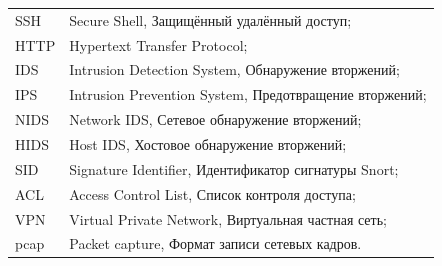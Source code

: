 
\noindent
\begin{tabular}{@{}p{2.8cm}@{\ \mdash\ }p{11.8cm}@{}}
SSH & Secure Shell, Защищённый удалённый доступ;\\
HTTP & Hypertext Transfer Protocol;\\
IDS & Intrusion Detection System, Обнаружение вторжений;\\
IPS & Intrusion Prevention System, Предотвращение вторжений;\\
NIDS & Network IDS, Сетевое обнаружение вторжений;\\
HIDS & Host IDS, Хостовое обнаружение вторжений;\\
SID & Signature Identifier, Идентификатор сигнатуры Snort;\\
ACL & Access Control List, Список контроля доступа;\\
VPN & Virtual Private Network, Виртуальная частная сеть;\\
pcap & Packet capture, Формат записи сетевых кадров.
\end{tabular}
